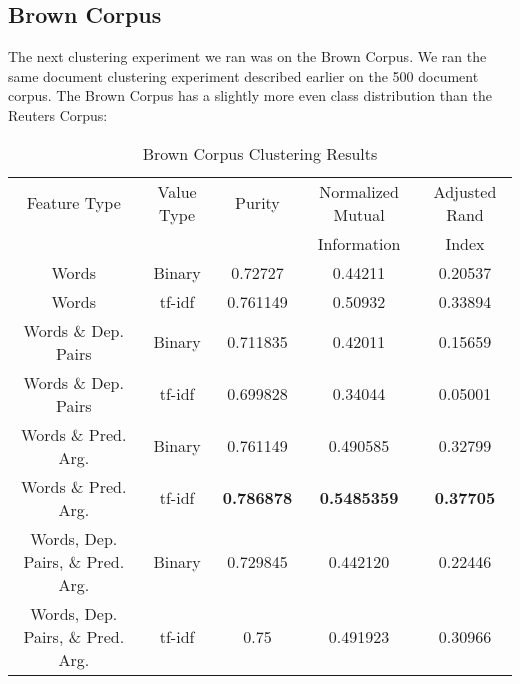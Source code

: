 \documentclass[11pt]{article}
\newcommand{\headcol}{\rowcolor{tableheadcolor}} %
\begin{document}
\subsection{Brown Corpus}

The next clustering experiment we ran was on the Brown Corpus. We ran the same document clustering experiment described earlier on the 500 document corpus. The Brown Corpus has a slightly more even class distribution than the Reuters Corpus:

\pgfplotsset{width=12cm}
\begin{figure}[H]
\label{fig:BrownClassDist}
\centering
{}
\end{figure}

\begin{table}[H]
\caption{Brown Corpus Clustering Results}
\label{tbl:BrownClusteringResults}
\begin{tabular}{|c|c|c|c|c|}
\hline
\headcol \color{white} Feature Type & \color{white} Value Type & \color{white} Purity & \color{white} Normalized Mutual  & \color{white} Adjusted Rand  \\
 \headcol & & &  \color{white} Information & \color{white}  Index \\
\hline
Words & Binary & 0.72727 & 0.44211 &  0.20537  \\
Words & tf-idf &  0.761149  & 0.50932 & 0.33894\\
Words \& Dep. Pairs & Binary & 0.711835 & 0.42011 & 0.15659 \\
Words \& Dep. Pairs & tf-idf & 0.699828 & 0.34044 & 0.05001 \\
Words \& Pred. Arg. & Binary & 0.761149 & 0.490585 & 0.32799 \\
Words \& Pred. Arg.  & tf-idf & \textbf{0.786878} & \textbf{0.5485359} & \textbf{0.37705} \\
Words, Dep. Pairs, \& Pred. Arg. & Binary & 0.729845 & 0.442120 & 0.22446 \\
Words, Dep. Pairs, \& Pred. Arg.& tf-idf & 0.75 & 0.491923 & 0.30966 \\
\hline
\end{tabular}
\end{table}
\end{document}
